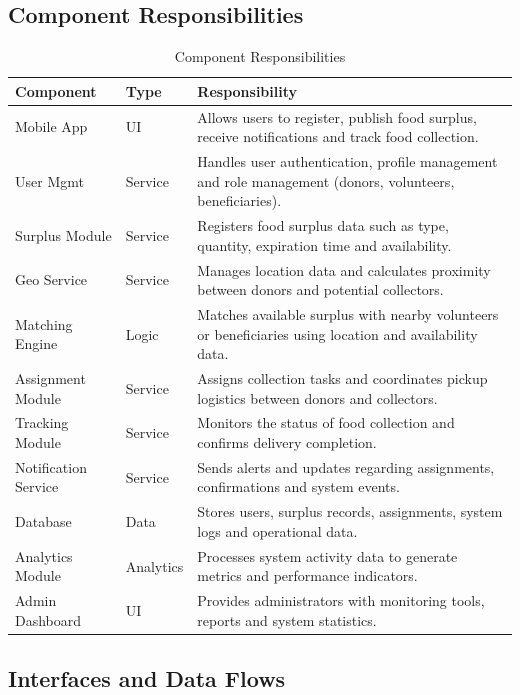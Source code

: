 \documentclass[conference]{IEEEtran}
\begin{document}
\subsection{Component Responsibilities}
\begin{table}[h]
\centering
\caption{Component Responsibilities}
\label{tab:components}
\begin{tabular}{@{}p{2.0cm}p{1.5cm}p{4.5cm}@{}}
\toprule
\textbf{Component} & \textbf{Type} & \textbf{Responsibility} \\
\midrule
Mobile App & UI & Allows users to register, publish food surplus, receive notifications and track food collection. \\
User Mgmt & Service & Handles user authentication, profile management and role management (donors, volunteers, beneficiaries). \\
Surplus Module & Service & Registers food surplus data such as type, quantity, expiration time and availability. \\
Geo Service & Service & Manages location data and calculates proximity between donors and potential collectors. \\
Matching Engine & Logic & Matches available surplus with nearby volunteers or beneficiaries using location and availability data. \\
Assignment Module & Service & Assigns collection tasks and coordinates pickup logistics between donors and collectors. \\
Tracking Module & Service & Monitors the status of food collection and confirms delivery completion. \\
Notification Service & Service & Sends alerts and updates regarding assignments, confirmations and system events. \\
Database & Data & Stores users, surplus records, assignments, system logs and operational data. \\
Analytics Module & Analytics & Processes system activity data to generate metrics and performance indicators. \\
Admin Dashboard & UI & Provides administrators with monitoring tools, reports and system statistics. \\
\bottomrule
\end{tabular}
\end{table}

\subsection{Interfaces and Data Flows}
\end{document}
